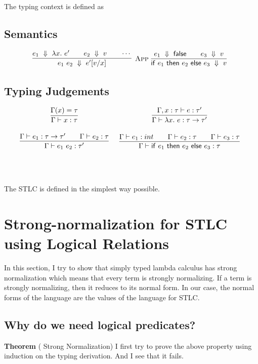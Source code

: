 \documentclass[10pt]{article}
\begin{document}
  The typing context is defined as 
   
   \subsection{Semantics}
  
  

    \begin{gather*}
	\infr[App]
{\dstep{e_1}{\lamdefe{x}{e'}} \iand \dstep{e_2}{v} \iand \cdots}
{\dstep{e_1~e_2}{\subst{x}{v}{e'}}}
  ~
  \infr
  {\dstep{e_1}{\falsev} \iand \dstep{e_3}{v}}
  {\dstep{\ife{e_1}{e_2}{e_3}}{v}}
  \\
  \end{gather*}
  
  \subsection{Typing Judgements}
  \[
  \begin{array}{cc}
  
  \envlookup{\typeEnv}{x}{\tau} 
  &
  \infr
  {\extenvent{x}{\tau}{e}{\tau'}}
  {\envent{\lamdefe{x}{e}}{\funct{\tau}{\tau'}}} 
  \\\\
  \infr
  {\envent{e_1}{\funct{\tau}{\tau'}} \iand 
  	\envent{e_2}{\tau}}
  {\envent{e_1~e_2}{\tau'}} 
  &
   \infr
  {\envent{e_1}{int} \iand \envent{e_2}{\tau} \iand \envent{e_3}{\tau}}
  {\envent{\ife{e_1}{e_2}{e_3}}{\tau}}
  \\\\
 
  &
  
  \\\\
  \end{array}
  \]
  
  
  The STLC is defined in the simplest way possible.
  
  
  \newpage
  \section{Strong-normalization for STLC using Logical Relations}
  In this section, I try to show that simply typed lambda calculus has strong normalization which means that every term is strongly normalizing. If a term is strongly normalizing, then it reduces to its normal form. In our case, the normal forms of the language are the values of the language for STLC.
  
  \subsection{Why do we need logical predicates?}
  \textbf{Theorem} ( Strong Normalization)
  \newline
  \vskip 0.1in
\vskip 0.2in
I first try to prove the above property using induction on the typing derivation. And I see that it fails.
\vskip 0.1in
\end{document}
